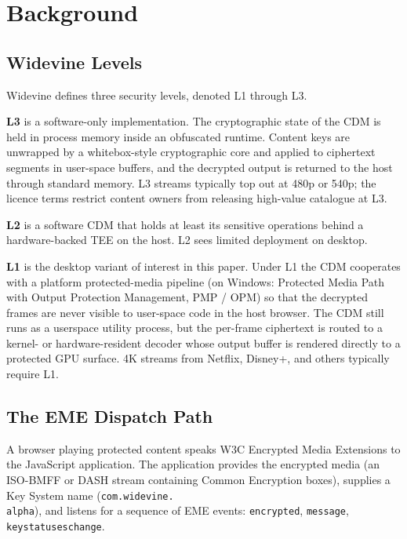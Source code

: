 \documentclass[11pt,letterpaper]{article}
\begin{document}
\section{Background}
\label{sec:background}

\subsection{Widevine Levels}

Widevine defines three security levels, denoted L1 through L3.

\textbf{L3} is a software-only implementation.  The cryptographic
state of the CDM is held in process memory inside an obfuscated
runtime.  Content keys are unwrapped by a whitebox-style cryptographic
core and applied to ciphertext segments in user-space buffers, and the
decrypted output is returned to the host through standard memory.
L3 streams typically top out at 480p or 540p; the licence terms
restrict content owners from releasing high-value catalogue at L3.

\textbf{L2} is a software CDM that holds at least its sensitive
operations behind a hardware-backed TEE on the host.  L2 sees limited
deployment on desktop.

\textbf{L1} is the desktop variant of interest in this paper.  Under
L1 the CDM cooperates with a platform protected-media pipeline (on
Windows: Protected Media Path with Output Protection Management, PMP /
OPM) so that the decrypted frames are never visible to user-space
code in the host browser.  The CDM still runs as a userspace utility
process, but the per-frame ciphertext is routed to a kernel- or
hardware-resident decoder whose output buffer is rendered directly to
a protected GPU surface.  4K streams from Netflix, Disney+, and
others typically require L1.

\subsection{The EME Dispatch Path}

A browser playing protected content speaks W3C Encrypted Media
Extensions to the JavaScript application.  The application provides
the encrypted media (an ISO-BMFF or DASH stream containing Common
Encryption boxes), supplies a Key System name
(\texttt{com.widevine.\\alpha}), and listens for a sequence of EME
events: \texttt{encrypted}, \texttt{message},
\texttt{keystatuseschange}.
\end{document}
